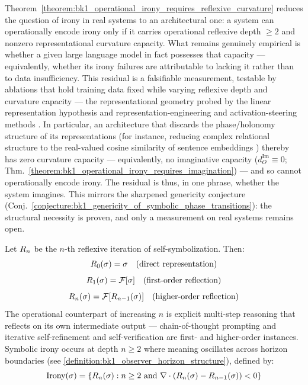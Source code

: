 \begin{conjecture}
\label{conjecture:bk1_symbolic_irony_encoding_llms}
Theorem~\ref{theorem:bk1_operational_irony_requires_reflexive_curvature} reduces
the question of irony in real systems to an architectural one: a system can
operationally encode irony only if it carries operational reflexive depth $\ge2$
and nonzero representational curvature capacity. What remains genuinely empirical
is whether a given large language model in fact possesses that capacity ---
equivalently, whether its irony failures are attributable to lacking it rather
than to data insufficiency. This residual is a falsifiable measurement, testable
by ablations that hold training data fixed while varying reflexive depth and
curvature capacity --- the representational geometry probed by the linear
representation hypothesis \citep{park2023linear} and representation-engineering
and activation-steering methods \citep{zou2023representation,turner2023activation}. In particular, an architecture that
discards the phase/holonomy structure of its representations (for instance,
reducing complex relational structure to the real-valued cosine similarity of
sentence embeddings \citep{reimers2019sentence}) thereby has zero curvature
capacity --- equivalently, no imaginative capacity ($d_O^{\mathrm{Im}}\equiv 0$;
Thm.~\ref{theorem:bk1_operational_irony_requires_imagination}) --- and so cannot
operationally encode irony. The residual is thus, in one phrase, whether the
system imagines. This mirrors the sharpened genericity conjecture
(Conj.~\ref{conjecture:bk1_genericity_of_symbolic_phase_transitions}): the
structural necessity is proven, and only a measurement on real systems remains
open.
\end{conjecture}

\begin{definition}
\label{definition:bk1_reflexive_encoding_depth}
Let $R_n$ be the $n$-th reflexive iteration of self-symbolization. Then:
\[
R_0(\sigma) = \sigma \quad \text{(direct representation)}
\]
\[
R_1(\sigma) = \mathcal{F}[\sigma] \quad \text{(first-order reflection)}
\]
\[
R_n(\sigma) = \mathcal{F}[R_{n-1}(\sigma)] \quad \text{(higher-order reflection)}
\]
The operational counterpart of increasing $n$ is explicit multi-step reasoning that reflects on its own intermediate output --- chain-of-thought prompting \citep{wei2022chain} and iterative self-refinement and self-verification \citep{madaan2023selfrefine,dhuliawala2023chainofverification} are first- and higher-order instances. Symbolic irony occurs at depth $n \geq 2$ where meaning oscillates across horizon boundaries (see \ref{definition:bk1_observer_horizon_structure}), defined by:
\[
\text{Irony}(\sigma) = \{R_n(\sigma) : n \geq 2 \text{ and } \nabla \cdot (R_n(\sigma) - R_{n-1}(\sigma)) < 0\}
\]
\end{definition}

